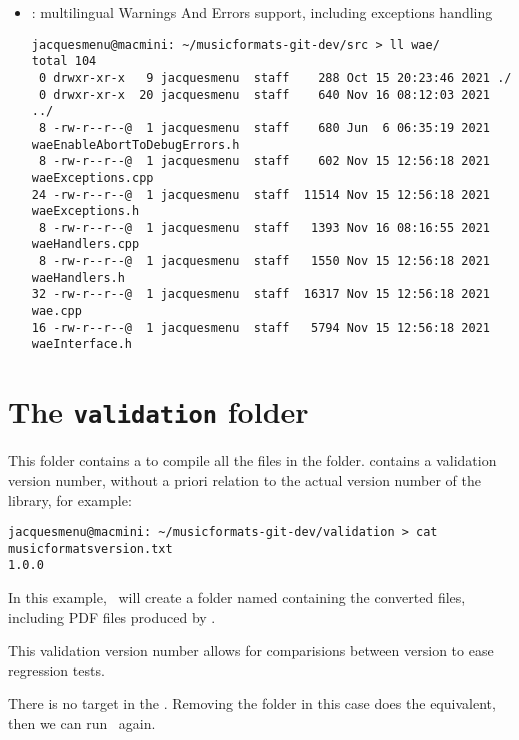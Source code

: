 \begin{itemize}
\item {} : multilingual Warnings And Errors support, including exceptions handling
\begin{lstlisting}[language=Terminal]
jacquesmenu@macmini: ~/musicformats-git-dev/src > ll wae/
total 104
 0 drwxr-xr-x   9 jacquesmenu  staff    288 Oct 15 20:23:46 2021 ./
 0 drwxr-xr-x  20 jacquesmenu  staff    640 Nov 16 08:12:03 2021 ../
 8 -rw-r--r--@  1 jacquesmenu  staff    680 Jun  6 06:35:19 2021 waeEnableAbortToDebugErrors.h
 8 -rw-r--r--@  1 jacquesmenu  staff    602 Nov 15 12:56:18 2021 waeExceptions.cpp
24 -rw-r--r--@  1 jacquesmenu  staff  11514 Nov 15 12:56:18 2021 waeExceptions.h
 8 -rw-r--r--@  1 jacquesmenu  staff   1393 Nov 16 08:16:55 2021 waeHandlers.cpp
 8 -rw-r--r--@  1 jacquesmenu  staff   1550 Nov 15 12:56:18 2021 waeHandlers.h
32 -rw-r--r--@  1 jacquesmenu  staff  16317 Nov 15 12:56:18 2021 wae.cpp
16 -rw-r--r--@  1 jacquesmenu  staff   5794 Nov 15 12:56:18 2021 waeInterface.h
\end{lstlisting}

\end{itemize}


\section{The {\tt validation} folder}

This folder contains a  to compile all the files in the  folder.
 contains a validation version number, without a priori relation to the actual version number of the library, for example:
\begin{lstlisting}[language=Terminal]
jacquesmenu@macmini: ~/musicformats-git-dev/validation > cat musicformatsversion.txt
1.0.0
\end{lstlisting}

In this example, \make\ will create a folder named  containing the converted files, including PDF files produced by .

This validation version number allows for comparisions between version to ease regression tests.

There is no  target in the . Removing the  folder in this case does the equivalent, then we can run \make\ again.




